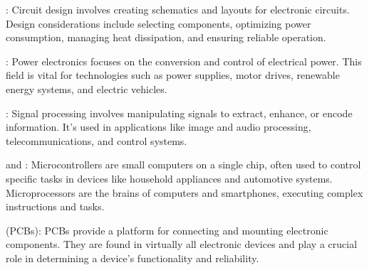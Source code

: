     \item {}: Circuit design involves creating schematics and layouts for electronic circuits. Design considerations include selecting components, optimizing power consumption, managing heat dissipation, and ensuring reliable operation.

    \item {}: Power electronics focuses on the conversion and control of electrical power. This field is vital for technologies such as power supplies, motor drives, renewable energy systems, and electric vehicles.

    \item {}: Signal processing involves manipulating signals to extract, enhance, or encode information. It's used in applications like image and audio processing, telecommunications, and control systems.

    \item {} and : Microcontrollers are small computers on a single chip, often used to control specific tasks in devices like household appliances and automotive systems. Microprocessors are the brains of computers and smartphones, executing complex instructions and tasks.

    \item {} (PCBs): PCBs provide a platform for connecting and mounting electronic components. They are found in virtually all electronic devices and play a crucial role in determining a device's functionality and reliability.

